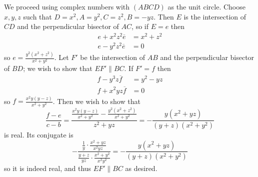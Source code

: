 We proceed using complex numbers with $(ABCD)$ as the unit circle. Choose $x,y,z$ such that $D=x^2,A=y^2,C=z^2,B=-yz$. Then $E$ is the intersection of $CD$ and the perpendicular bisector of $AC$, so if $E=e$ then
\begin{align*}
	e+x^2z^2\overline{e} &= x^2+z^2 \\
	e-y^2z^2\overline{e} &= 0
\end{align*}
so $e=\frac{y^2(x^2+z^2)}{x^2+y^2}$. Let $F'$ be the intersection of $AB$ and the perpendicular bisector of $BD$; we wish to show that $EF'\parallel BC$. If $F'=f$ then
\begin{align*}
	f-y^3z\overline{f} &= y^2-yz \\
	f+x^2yz\overline{f} &= 0
\end{align*}
so $f=\frac{x^2y(y-z)}{x^2+y^2}$. Then we wish to show that
\[
	\frac{f-e}{c-b} = \frac{\frac{x^2y(y-z)}{x^2+y^2}-\frac{y^2(x^2+z^2)}{x^2+y^2}}{z^2+yz} = -\frac{y(x^2+yz)}{(y+z)(x^2+y^2)}
\]
is real. Its conjugate is
\[
	-\frac{\frac{1}{y}\cdot\frac{x^2+yz}{x^2yz}}{\frac{y+z}{yz}\cdot\frac{x^2+y^2}{x^2y^2}} = -\frac{y(x^2+yz)}{(y+z)(x^2+y^2)}
\]
so it is indeed real, and thus $EF'\parallel BC$ as desired.
